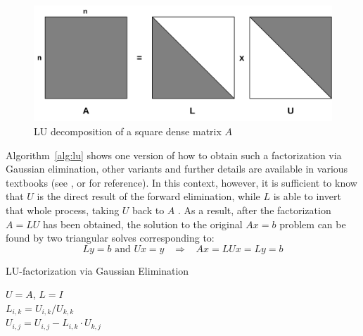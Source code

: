 \begin{figure}[h]
    \centering
    \includegraphics[width=0.75\linewidth]{figures/lu.pdf}
    \caption{LU decomposition of a square dense matrix $A$}
    \label{fig:lu_decomposition}
\end{figure}

\noindent Algorithm~\hyperref[alg:lu]{\ref{alg:lu}} shows one version of how to obtain such a factorization via Gaussian elimination, other variants and further details are available in various textbooks (see \cite{strang_introduction_2009}, \cite{golub_matrix_2013} or \cite{singh_linear_2014} for reference). In this context, however, it is sufficient to know that $U$ is the direct result of the forward elimination, while $L$ is able to invert that whole process, taking $U$ back to $A$ \cite{strang_introduction_2009}. As a result, after the factorization $A=LU$ has been obtained, the solution to the original $Ax=b$ problem can be found by two triangular solves corresponding to:
\begin{equation}
    Ly=b \text{ and } Ux=y 	\;\;\; \Rightarrow \;\;\; Ax=LUx=Ly=b
\end{equation}

\begin{algorithm}[h]
  \caption{LU-factorization via Gaussian Elimination}
  \label{alg:lu}
  \SetAlgoLined
  $U=A$, $L=I$ \\
   {
     {
      $L_{i, k} = U_{i, k} / U_{k, k}$ \\
       {
        $U_{i, j} = U_{i, j} - L_{i, k} \cdot U_{k,j}$
      }
    }
  }
\end{algorithm}

